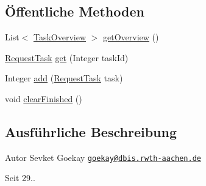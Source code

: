 \subsection*{Öffentliche Methoden}
\begin{DoxyCompactItemize}
\item 
List$<$ \hyperlink{classde_1_1rwth_1_1idsg_1_1steve_1_1repository_1_1dto_1_1_task_overview}{Task\-Overview} $>$ \hyperlink{classde_1_1rwth_1_1idsg_1_1steve_1_1repository_1_1impl_1_1_request_task_store_impl_afd8239a9c6be044a344a1e99b3ab0156}{get\-Overview} ()
\item 
\hyperlink{classde_1_1rwth_1_1idsg_1_1steve_1_1web_1_1dto_1_1task_1_1_request_task}{Request\-Task} \hyperlink{classde_1_1rwth_1_1idsg_1_1steve_1_1repository_1_1impl_1_1_request_task_store_impl_afae9b820ad70b8bdabea36ed025d1a50}{get} (Integer task\-Id)
\item 
Integer \hyperlink{classde_1_1rwth_1_1idsg_1_1steve_1_1repository_1_1impl_1_1_request_task_store_impl_ab0037e5f63adb2663329682368c527a5}{add} (\hyperlink{classde_1_1rwth_1_1idsg_1_1steve_1_1web_1_1dto_1_1task_1_1_request_task}{Request\-Task} task)
\item 
void \hyperlink{classde_1_1rwth_1_1idsg_1_1steve_1_1repository_1_1impl_1_1_request_task_store_impl_ac9279a591b9e553475d673d480aa6e6f}{clear\-Finished} ()
\end{DoxyCompactItemize}


\subsection{Ausführliche Beschreibung}
\begin{DoxyAuthor}{Autor}
Sevket Goekay \href{mailto:goekay@dbis.rwth-aachen.de}{\tt goekay@dbis.\-rwth-\/aachen.\-de} 
\end{DoxyAuthor}
\begin{DoxySince}{Seit}
29.. 
\end{DoxySince}


